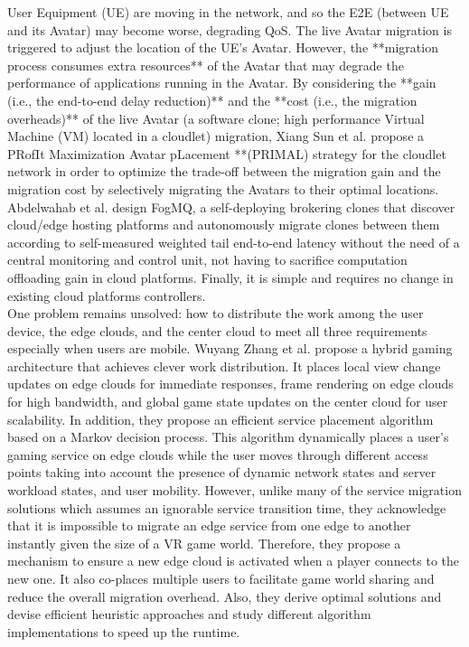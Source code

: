 \cite{sun2016primal}
User Equipment (UE) are moving in the network, and so the E2E (between UE and its Avatar) may become worse, degrading QoS. The live Avatar migration is triggered to adjust the location of the UE’s Avatar. However, the **migration process consumes extra resources** of the Avatar that may degrade the performance of applications running in the Avatar. By considering the **gain (i.e., the end-to-end delay reduction)** and the **cost (i.e., the migration overheads)** of the live Avatar (a software clone; high performance Virtual Machine (VM) located in a cloudlet) migration, Xiang Sun et al. propose a PRofIt Maximization Avatar pLacement **(PRIMAL) strategy for the cloudlet network in order to optimize the trade-off between the migration gain and the migration cost by selectively migrating the Avatars to their optimal locations.\\

\cite{abdelwahab2018clones}
Abdelwahab et al. design FogMQ, a self-deploying brokering clones that discover cloud/edge hosting platforms and autonomously migrate clones between them according to self-measured weighted tail end-to-end latency without the need of a central monitoring and control unit, not having to sacrifice computation offloading gain in cloud platforms. Finally, it is simple and requires no change in existing cloud platforms controllers.\\

\cite{Zhang2017}
One problem remains unsolved: how to distribute the work among the user device, the edge clouds, and the center cloud to meet all three requirements especially when users are mobile. Wuyang Zhang et al. propose a hybrid gaming architecture that achieves clever work distribution. It places local view change updates on edge clouds for immediate responses, frame rendering on edge clouds for high bandwidth, and global game state updates on the center cloud for user scalability. In addition, they propose an efficient service placement algorithm based on a Markov decision process. This algorithm dynamically places a user’s gaming service on edge clouds while the user moves through different access points taking into account the presence of dynamic network states and server workload states, and user mobility. However, unlike many of the service migration solutions which assumes an ignorable service transition time, they acknowledge that it is impossible to migrate an edge service from one edge to another instantly given the size of a VR game world. Therefore, they propose a mechanism to ensure a new edge cloud is activated when a player connects to the new one. It also co-places multiple users to facilitate game world sharing and reduce the overall migration overhead. Also, they derive optimal solutions and devise efficient heuristic approaches and study different algorithm implementations to speed up the runtime.\\

